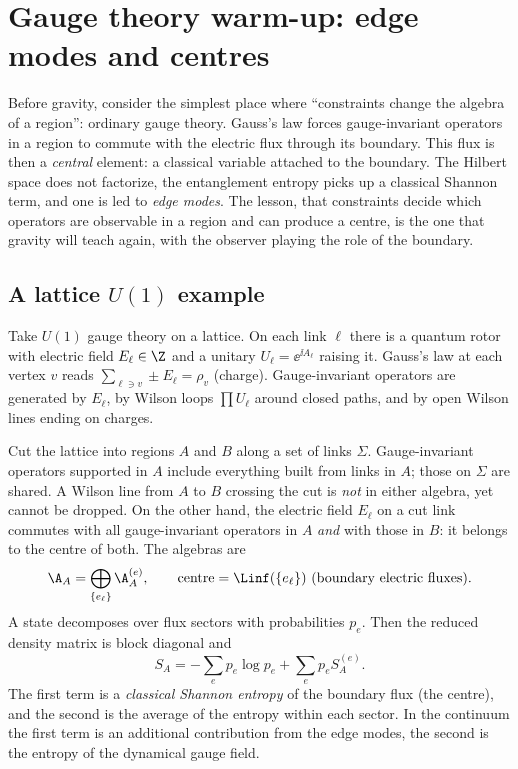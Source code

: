 \chapter{Gauge theory warm-up: edge modes and centres}\label{ch:gauge_warmup}

\begin{physmotiv}
Before gravity, consider the simplest place where ``constraints change the algebra of a region'': ordinary gauge theory. Gauss's law forces gauge-invariant operators in a region to commute with the electric flux through its boundary. This flux is then a \emph{central} element: a classical variable attached to the boundary. The Hilbert space does not factorize, the entanglement entropy picks up a classical Shannon term, and one is led to \emph{edge modes}. The lesson, that constraints decide which operators are observable in a region and can produce a centre, is the one that gravity will teach again, with the observer playing the role of the boundary.
\end{physmotiv}

\section{A lattice $U(1)$ example}

Take $U(1)$ gauge theory on a lattice. On each link $\ell$ there is a quantum rotor with electric field $E_\ell\in\Z$ and a unitary $U_\ell=\ee^{\ii A_\ell}$ raising it. Gauss's law at each vertex $v$ reads $\sum_{\ell\ni v}\pm E_\ell=\rho_v$ (charge). Gauge-invariant operators are generated by $E_\ell$, by Wilson loops $\prod U_\ell$ around closed paths, and by open Wilson lines ending on charges.

Cut the lattice into regions $A$ and $B$ along a set of links $\Sigma$. Gauge-invariant operators supported in $A$ include everything built from links in $A$; those on $\Sigma$ are shared. A Wilson line from $A$ to $B$ crossing the cut is \emph{not} in either algebra, yet cannot be dropped. On the other hand, the electric field $E_\ell$ on a cut link commutes with all gauge-invariant operators in $A$ \emph{and} with those in $B$: it belongs to the centre of both. The algebras are
\begin{equation}
\A_A=\bigoplus_{\{e_\ell\}}\A_A^{(e)},\qquad\text{centre}=\Linf(\{e_\ell\})\ \text{(boundary electric fluxes)}.
\end{equation}
A state decomposes over flux sectors with probabilities $p_e$. Then the reduced density matrix is block diagonal and
\begin{equation}
S_A=-\sum_ep_e\log p_e+\sum_ep_eS_A^{(e)}.
\end{equation}
The first term is a \emph{classical Shannon entropy} of the boundary flux (the centre), and the second is the average of the entropy within each sector. In the continuum the first term is an additional contribution from the edge modes, the second is the entropy of the dynamical gauge field.

